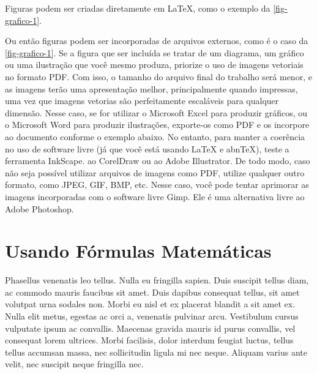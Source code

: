 Figuras podem ser criadas diretamente em LaTeX,
como o exemplo da \ref{fig-grafico-1}.

\begin{figure}[ht!]
	\centering
\end{figure}

Ou então figuras podem ser incorporadas de arquivos externos, como é o caso da \autoref{fig-grafico-1}. Se a figura que ser incluída se tratar de um diagrama, um gráfico ou uma ilustração que você mesmo produza, priorize o uso de imagens vetoriais no formato PDF. Com isso, o tamanho do arquivo final do trabalho será menor, e as imagens terão uma apresentação melhor, principalmente quando impressas, uma vez que imagens vetorias são perfeitamente escaláveis para qualquer dimensão. Nesse caso, se for utilizar o Microsoft Excel para produzir gráficos, ou o Microsoft Word para produzir ilustrações, exporte-os como PDF e os incorpore ao documento conforme o exemplo abaixo. No entanto, para manter a coerência no uso de software livre (já que você está usando LaTeX e abnTeX),  teste a ferramenta InkScape. ao CorelDraw ou ao Adobe Illustrator.  De todo modo, caso não seja possível  utilizar arquivos de imagens como PDF, utilize qualquer outro formato, como JPEG, GIF, BMP, etc.  Nesse caso, você pode tentar aprimorar as imagens incorporadas com o software livre Gimp. Ele é uma alternativa livre ao Adobe Photoshop.

\section{Usando Fórmulas Matemáticas}

Phasellus venenatis leo tellus. Nulla eu fringilla sapien. Duis suscipit tellus diam, ac commodo mauris faucibus sit amet. Duis dapibus consequat tellus, sit amet volutpat urna sodales non. Morbi eu nisl et ex placerat blandit a sit amet ex. Nulla elit metus, egestas ac orci a, venenatis pulvinar arcu. Vestibulum cursus vulputate ipsum ac convallis. Maecenas gravida mauris id purus convallis, vel consequat lorem ultrices. Morbi facilisis, dolor interdum feugiat luctus, tellus tellus accumsan massa, nec sollicitudin ligula mi nec neque. Aliquam varius ante velit, nec suscipit neque fringilla nec.

